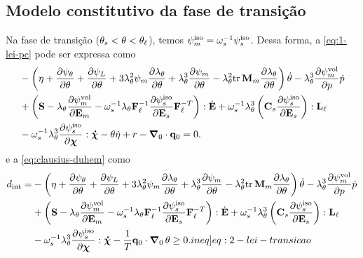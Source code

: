 \documentclass[Tese.tex]{subfiles}
\begin{document}
\subsection{Modelo constitutivo da fase de transição}\label{sec:transicao}

Na fase de transição ($\theta_s < \theta < \theta_\ell$), temos $\psi_m^\text{iso} = \omega_s^{-1}\psi_s^\text{iso}$. Dessa forma, a \cref{eq:1-lei-pc} pode ser expressa como
\begin{equation}
\begin{aligned}
&-\left(\eta+\dfrac{\partial\psi_{\theta}}{\partial\theta} + \dfrac{\partial\psi_L}{\partial\theta} + 3\lambda_{\theta}^2\psi_m\dfrac{\partial\lambda_{\theta}}{\partial\theta} + \lambda_{\theta}^3\dfrac{\partial\psi_m}{\partial\theta} - \lambda_{\theta}^2\text{tr}\,\mathbf{M}_m\dfrac{\partial\lambda_{\theta}}{\partial\theta}\right)\dot{\theta} - \lambda_{\theta}^3\dfrac{\partial\psi_m^\text{vol}}{\partial p}\dot{p}\\
&+\left(\mathbf{S} - \lambda_{\theta}\dfrac{\partial\psi_m^\text{vol}}{\partial\mathbf{E}_m} - \omega_s^{-1}\lambda_{\theta}\mathbf{F}_\ell^{-1}\dfrac{\partial\psi_s^\text{iso}}{\partial\mathbf{E}_s}\mathbf{F}_\ell^{-T}\right):\dot{\mathbf{E}} + \omega_s^{-1}\lambda_{\theta}^3\left(\mathbf{C}_s\dfrac{\partial\psi_s^\text{iso}}{\partial\mathbf{E}_s}\right):\mathbf{L}_\ell \\
&- \omega_s^{-1}\lambda_{\theta}^3\dfrac{\partial\psi_s^\text{iso}}{\partial\boldsymbol{\chi}}:\boldsymbol{\dot{\chi}}
-\theta \dot{\eta} + r - \boldsymbol{\nabla}_0\cdot\mathbf{q}_0 = 0. \label{eq:1-lei-transicao}
\end{aligned}
\end{equation}
e a \cref{eq:clausius-duhem} como
\begin{equation}
\begin{aligned}
\dissipation = &-\left(\entropy+\dfrac{\partial\helmholtzt}{\partial\temp} + \dfrac{\partial\helmholtzL}{\partial\temp} + 3\alongTermico^2\helmholtzm\dfrac{\partial\alongTermico}{\partial\temp} + \alongTermico^3\dfrac{\partial\helmholtzm}{\partial\temp} - \alongTermico^2\tr\mandelm\dfrac{\partial\alongTermico}{\partial\temp}\right)\dottemp - \alongTermico^3\dfrac{\partial\helmholtzmvol}{\partial\p}\dotp\\
&+\left(\S - \alongTermico\dfrac{\partial\helmholtzmvol}{\partial\Em} - \solidMultiplier^{-1}\alongTermico\Fl^{-1}\dfrac{\partial\helmholtzs}{\partial\Es}\Fl^{-T}\right):\dotE + \solidMultiplier^{-1}\alongTermico^3\left(\Cs\dfrac{\partial\helmholtzs}{\partial\Es}\right):\Ll \\
&- \solidMultiplier^{-1}\alongTermico^3\dfrac{\partial\helmholtzs}{\partial\internalVariables}:\dotInternalVariables - \dfrac{1}{T}\qi\cdot\gradientei\,\temp \geq 0. \label[ineq]{eq:2-lei-transicao}
\end{aligned}
\end{equation}
\end{document}
